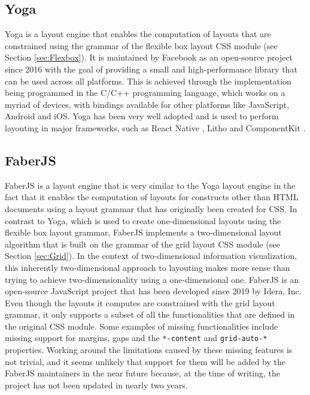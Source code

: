 \subsection{Yoga}

Yoga \parencite{Yoga} is a layout engine that enables the computation of layouts that are constrained using the grammar of the flexible box layout CSS module (see Section \ref{sec:Flexbox}). It is maintained by Facebook as an open-source project since 2016 \parencite{YogaRelease} with the goal of providing a small and high-performance library that can be used across all platforms. This is achieved through the implementation being programmed in the C/C++ programming language, which works on a myriad of devices, with bindings available for other platforms like JavaScript, Android and iOS. Yoga has been very well adopted and is used to perform layouting in major frameworks, such as React Native \parencite{ReactNative}, Litho \parencite{Litho} and ComponentKit \parencite{ComponentKit}.

\subsection{FaberJS}

FaberJS \parencite{FaberJS} is a layout engine that is very similar to the Yoga layout engine in the fact that it enables the computation of layouts for constructs other than HTML documents using a layout grammar that has originally been created for CSS. In contrast to Yoga, which is used to create one-dimensional layouts using the flexible box layout grammar, FaberJS implements a two-dimensional layout algorithm that is built on the grammar of the grid layout CSS module (see Section \ref{sec:Grid}). In the context of two-dimensional information visualization, this inherently two-dimensional approach to layouting makes more sense than trying to achieve two-dimensionality using a one-dimensional one. FaberJS is an open-source JavaScript project that has been developed since 2019 by Idera, Inc. Even though the layouts it computes are constrained with the grid layout grammar, it only supports a subset of all the functionalities that are defined in the original CSS module. Some examples of missing functionalities include missing support for margins, gaps and the \lstinline{*-content} and \lstinline{grid-auto-*} properties. Working around the limitations caused by these missing features is not trivial, and it seems unlikely that support for them will be added by the FaberJS maintainers in the near future because, at the time of writing, the project has not been updated in nearly two years. 

